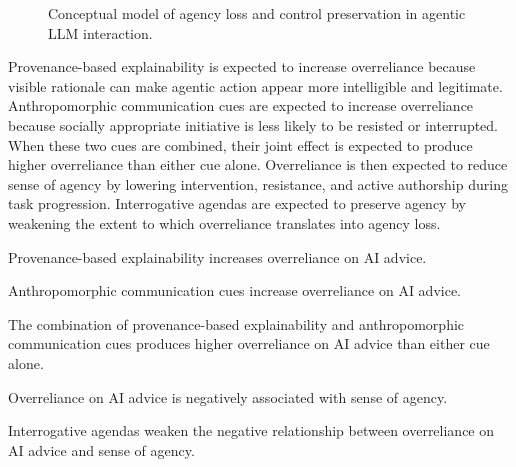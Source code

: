 \documentclass[sigconf,review,anonymous]{acmart}
\begin{document}
\begin{figure}[ht]
    \centering
    \caption{Conceptual model of agency loss and control preservation in agentic LLM interaction.}
    \label{fig:model}
\end{figure}

Provenance-based explainability is expected to increase overreliance because visible rationale can make agentic action appear more intelligible and legitimate. Anthropomorphic communication cues are expected to increase overreliance because socially appropriate initiative is less likely to be resisted or interrupted. When these two cues are combined, their joint effect is expected to produce higher overreliance than either cue alone. Overreliance is then expected to reduce sense of agency by lowering intervention, resistance, and active authorship during task progression. Interrogative agendas are expected to preserve agency by weakening the extent to which overreliance translates into agency loss.

\begin{description}[leftmargin=0em,itemsep=0.4em]
    \item[\textbf{H1.}] Provenance-based explainability increases overreliance on AI advice.
    \item[\textbf{H2.}] Anthropomorphic communication cues increase overreliance on AI advice.
    \item[\textbf{H3.}] The combination of provenance-based explainability and anthropomorphic communication cues produces higher overreliance on AI advice than either cue alone.
    \item[\textbf{H4.}] Overreliance on AI advice is negatively associated with sense of agency.
    \item[\textbf{H5.}] Interrogative agendas weaken the negative relationship between overreliance on AI advice and sense of agency.
\end{description}
\end{document}
